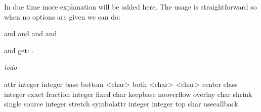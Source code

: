 In due time more explanation will be added here. The usage is straightforward so
when no options are given we can do:

\startbuffer
{} and
 and
\im {\Umiddle |} and
 and
\stopbuffer

\typebuffer

and get: \inlinebuffer .

\stopnewprimitive

\startnewprimitive[title={\prm {Umathaccent}}]

{\em todo} 





\starttabulate[|Tl|l|l|]
\NC attr        \NC integer integer                               \NC \NC \NR
\NC base        \NC                                               \NC \NC \NR
\NC bottom      \NC \type {[fixed]} <char>                        \NC \NC \NR
\NC both        \NC \type {[fixed]} <char> \type {[fixed]} <char> \NC \NC \NR
\NC center      \NC                                               \NC \NC \NR
\NC class       \NC integer                                       \NC \NC \NR
\NC exact       \NC                                               \NC \NC \NR
\NC fraction    \NC integer                                       \NC \NC \NR
\NC fixed       \NC char                                          \NC \NC \NR
\NC keepbase    \NC                                               \NC \NC \NR
\NC nooverflow  \NC                                               \NC \NC \NR
\NC overlay     \NC\type {[fixed]} char                           \NC \NC \NR
\NC shrink      \NC                                               \NC \NC \NR
\NC single      \NC                                               \NC \NC \NR
\NC source      \NC integer                                       \NC \NC \NR
\NC stretch     \NC                                               \NC \NC \NR
\NC symbolattr  \NC integer integer                               \NC \NC \NR
\NC top         \NC \type {[fixed]} char                          \NC \NC \NR
\NC usecallback \NC                                               \NC \NC \NR
\stoptabulate

